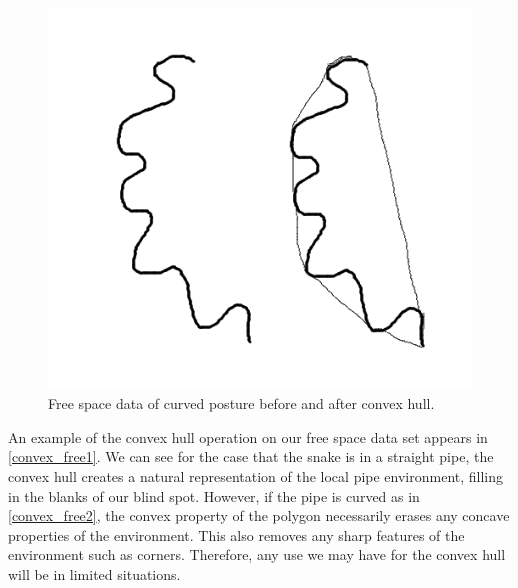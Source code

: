 \begin{figure}[htbp]
\centering
\includegraphics[keepaspectratio,width=400pt,height=0.75\textheight]{4_convex_freespace2.png}
\caption{Free space data of curved posture before and after convex hull.}
\label{convex_free2}
\end{figure}




An example of the convex hull operation on our free space data set appears in \autoref{convex_free1}. We can see for the case that the snake is in a straight pipe, the convex hull creates a natural representation of the local pipe environment, filling in the blanks of our blind spot. However, if the pipe is curved as in \autoref{convex_free2}, the convex property of the polygon necessarily erases any concave properties of the environment. This also removes any sharp features of the environment such as corners. Therefore, any use we may have for the convex hull will be in limited situations.




